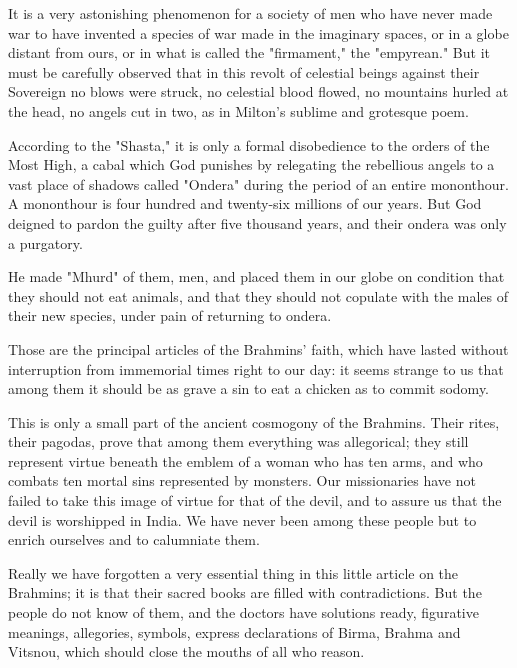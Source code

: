 It is a very astonishing phenomenon for a society of men who have never
made war to have invented a species of war made in the imaginary spaces,
or in a globe distant from ours, or in what is called the "firmament,"
the "empyrean." But it must be carefully observed that in this revolt of
celestial beings against their Sovereign no blows were struck, no
celestial blood flowed, no mountains hurled at the head, no angels cut
in two, as in Milton's sublime and grotesque poem.

According to the "Shasta," it is only a formal disobedience to the
orders of the Most High, a cabal which God punishes by relegating the
rebellious angels to a vast place of shadows called "Ondera" during the
period of an entire mononthour. A mononthour is four hundred and
twenty-six millions of our years. But God deigned to pardon the guilty
after five thousand years, and their ondera was only a purgatory.

He made "Mhurd" of them, men, and placed them in our globe on condition
that they should not eat animals, and that they should not copulate with
the males of their new species, under pain of returning to ondera.

Those are the principal articles of the Brahmins' faith, which have
lasted without interruption from immemorial times right to our day: it
seems strange to us that among them it should be as grave a sin to eat a
chicken as to commit sodomy.

This is only a small part of the ancient cosmogony of the Brahmins.
Their rites, their pagodas, prove that among them everything was
allegorical; they still represent virtue beneath the emblem of a woman
who has ten arms, and who combats ten mortal sins represented by
monsters. Our missionaries have not failed to take this image of virtue
for that of the devil, and to assure us that the devil is worshipped in
India. We have never been among these people but to enrich ourselves and
to calumniate them.

Really we have forgotten a very essential thing in this little article
on the Brahmins; it is that their sacred books are filled with
contradictions. But the people do not know of them, and the doctors have
solutions ready, figurative meanings, allegories, symbols, express
declarations of Birma, Brahma and Vitsnou, which should close the mouths
of all who reason.

